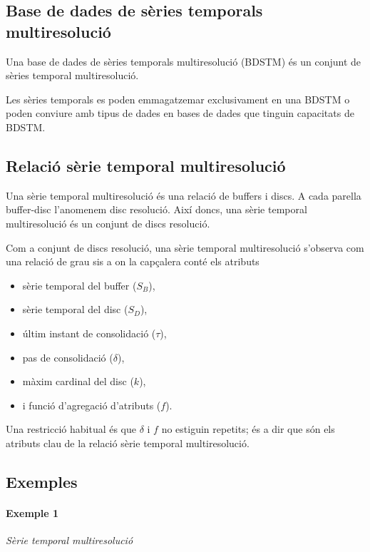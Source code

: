\subsection{Base de dades de sèries temporals
  multiresolució}\label{sec:model:bdstm}

Una base de dades de sèries temporals multiresolució (BDSTM) és un
conjunt de sèries temporal multiresolució.

Les sèries temporals es poden emmagatzemar exclusivament en una BDSTM
o poden conviure amb tipus de dades en bases de dades que tinguin
capacitats de BDSTM.



\subsection{Relació sèrie temporal multiresolució}



Una sèrie temporal multiresolució és una relació de buffers i discs. A
cada parella buffer-disc l'anomenem disc resolució. Així doncs, una
sèrie temporal multiresolució és un conjunt de discs resolució.

Com a conjunt de discs resolució, una sèrie temporal multiresolució
s'observa com una relació de grau sis a on la capçalera conté els
atributs
\begin{itemize}
\item sèrie temporal del buffer ($S_B$),
\item sèrie temporal del disc ($S_D$),
\item últim instant de consolidació ($\tau$),
\item pas de consolidació ($\delta$),
\item màxim cardinal del disc ($k$),
\item i funció d'agregació d'atributs ($f$).
\end{itemize}

Una restricció habitual és que $\delta$ i $f$ no estiguin repetits; és
a dir que són els atributs clau de la relació sèrie temporal multiresolució.





\subsection{Exemples}

\paragraph{Exemple 1} \emph{Sèrie temporal multiresolució}

